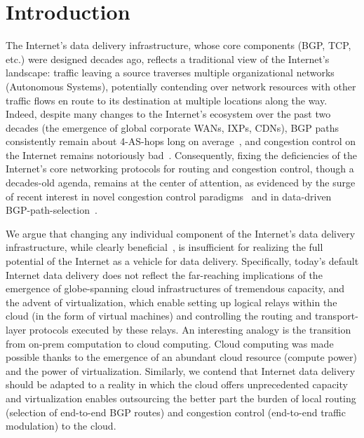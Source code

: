 \documentclass[10pt,sigconf]{acmart}
\begin{document}
\section{Introduction}

The Internet's data delivery infrastructure, whose core components (BGP, TCP, etc.) were designed decades ago, reflects a traditional view of the Internet's landscape: traffic leaving a source traverses multiple organizational networks (Autonomous Systems), potentially contending over network resources with other traffic flows en route to its destination at multiple locations along the way. Indeed, despite many changes to the Internet's ecosystem over the past two decades (the emergence of global corporate WANs, IXPs, CDNs), BGP paths consistently remain about 4-AS-hops long on average~\cite{x}, and congestion control on the Internet remains notoriously bad~\cite{PCC}. Consequently, fixing the deficiencies of the Internet's core networking protocols for routing and congestion control, though a decades-old agenda, remains at the center of attention, as evidenced by the surge of recent interest in novel congestion control paradigms~\cite{x,x,x,x,x,x} and in data-driven BGP-path-selection~\cite{x,y}.

We argue that changing any individual component of the Internet's data delivery infrastructure, while clearly beneficial~\cite{x,x,x,x}, is insufficient for realizing the full potential of the Internet as a vehicle for data delivery. Specifically, today's default Internet data delivery does not reflect the far-reaching implications of the emergence of globe-spanning cloud infrastructures of tremendous capacity, and the advent of virtualization, which enable setting up logical relays within the cloud (in the form of virtual machines) and controlling the routing and transport-layer protocols executed by these relays. An interesting analogy is the transition from on-prem computation to cloud computing. Cloud computing was made possible thanks to the emergence of an abundant cloud resource (compute power) and the power of virtualization. Similarly, we contend that Internet data delivery should be adapted to a reality in which the cloud offers unprecedented capacity and virtualization enables outsourcing the better part the burden of local routing (selection of end-to-end BGP routes) and congestion control (end-to-end traffic modulation) to the cloud.
\end{document}
